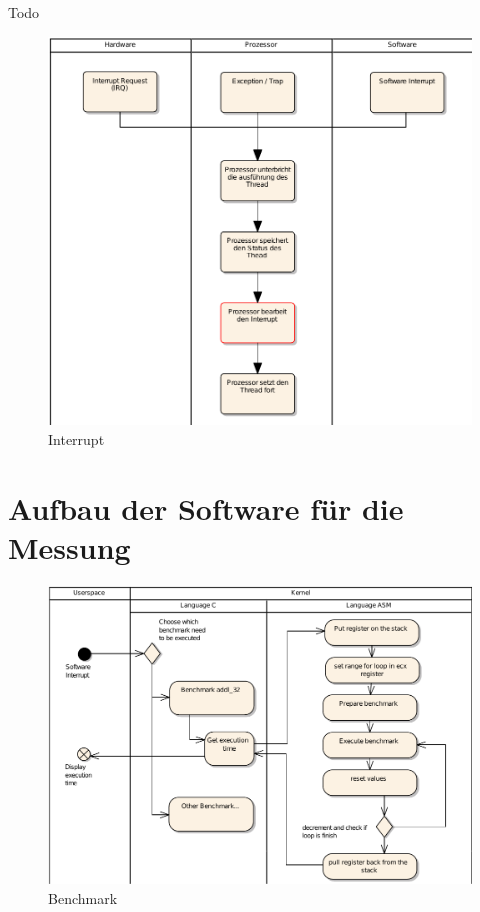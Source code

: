 Todo

\begin{figure}[H]
\centering
\includegraphics[width=1.0\textwidth]{images/interrupt_ea.pdf}
\caption{Interrupt}
\label{fig:Interrupt}
\end{figure}


\section{Aufbau der Software für die Messung}


\begin{figure}[H]
\centering
\includegraphics[width=1.0\textwidth]{images/benchmark_ea.pdf}
\caption{Benchmark}
\label{fig:Benchmark}
\end{figure}


